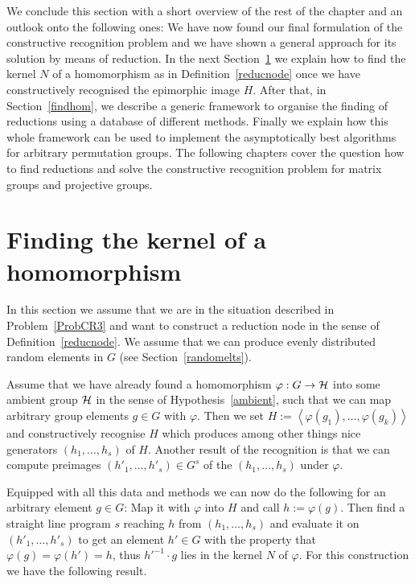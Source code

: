 \medskip
We conclude this section with a short overview of the rest of the chapter
and an outlook onto the following ones:
We have now found our final formulation of the constructive
recognition problem and we have shown a general approach for its solution
by means of reduction. In the next Section~\ref{findkernel} we explain how
to find the kernel $N$ of a homomorphism as in Definition~\ref{reducnode}
once we have constructively recognised the epimorphic image $H$. After
that,
in Section~\ref{findhom}, we describe a generic framework to organise the
finding of reductions using a database of different methods. Finally we
explain how this whole framework can be used to implement the
asymptotically best algorithms for arbitrary permutation groups.
The following chapters cover the question how to find reductions
and solve the constructive recognition problem for matrix groups and
projective groups.

\section{Finding the kernel of a homomorphism}
\label{findkernel}
%

In this section we assume that we are in the situation described in
Problem~\ref{ProbCR3} and want to construct a reduction node in the sense
of Definition~\ref{reducnode}. We assume that we can produce evenly
distributed random elements in $G$ (see Section~\ref{randomelts}).

Assume that we have already found a homomorphism
$\varphi : G \to \mathcal{H}$ into some ambient group $\mathcal{H}$ in the sense of
Hypothesis~\ref{ambient}, such that we can map arbitrary group elements
$g \in G$ with $\varphi$. Then we set $H := \left< \varphi(g_1), \ldots,
\varphi(g_k) \right>$ and constructively recognise $H$ which produces
among other things nice generators $(h_1, \ldots, h_s)$ of $H$. Another
result of the recognition is that we can compute preimages $(h'_1, \ldots,
h'_s) \in G^s$ of the $(h_1, \ldots, h_s)$ under $\varphi$.

Equipped with all this data and methods we can now do the following
for an arbitrary element $g \in G$: Map it with $\varphi$ into $H$
and call $h := \varphi(g)$. Then find a straight line program $s$ reaching
%
$h$ from $(h_1, \ldots, h_s)$ and evaluate it on $(h'_1, \ldots, h'_s)$
to get an element $h' \in G$ with the property that
$\varphi(g)=\varphi(h') = h$, thus $h'^{-1}\cdot g$ lies in the kernel $N$
of $\varphi$. For this construction we have the following result.


